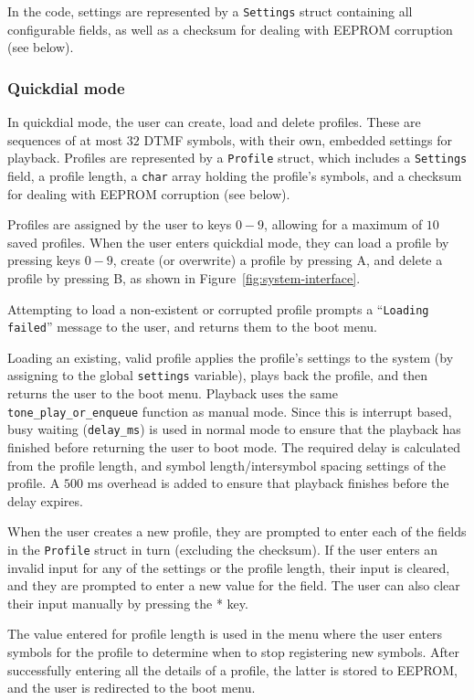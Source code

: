 \documentclass[11pt,a4paper,twocolumn]{scrartcl}
\begin{document}
In the code, settings are represented by a \verb!Settings! struct containing all configurable fields, as well as a checksum for dealing with EEPROM corruption (see below).

\subsubsection{Quickdial mode}

In quickdial mode, the user can create, load and delete profiles. These are sequences of at most $32$ DTMF symbols, with their own, embedded settings for playback. Profiles are represented by a \verb!Profile! struct, which includes a \verb!Settings! field, a profile length, a \verb!char! array holding the profile's symbols, and a checksum for dealing with EEPROM corruption (see below).

Profiles are assigned by the user to keys $0-9$, allowing for a maximum of $10$ saved profiles. When the user enters quickdial mode, they can load a profile by pressing keys $0-9$, create (or overwrite) a profile by pressing A, and delete a profile by pressing B, as shown in Figure~\ref{fig:system-interface}.

Attempting to load a non-existent or corrupted profile prompts a ``\verb!Loading failed!'' message to the user, and returns them to the boot menu. 

Loading an existing, valid profile applies the profile's settings to the system (by assigning to the global \verb!settings! variable), plays back the profile, and then returns the user to the boot menu. Playback uses the same \verb!tone_play_or_enqueue! function as manual mode. Since this is interrupt based, busy waiting (\verb!delay_ms!) is used in normal mode to ensure that the playback has finished before returning the user to boot mode. The required delay is calculated from the profile length, and symbol length/intersymbol spacing settings of the profile. A $500$ ms overhead is added to ensure that playback finishes before the delay expires.

When the user creates a new profile, they are prompted to enter each of the fields in the \verb!Profile! struct in turn (excluding the checksum). If the user enters an invalid input for any of the settings or the profile length, their input is cleared, and they are prompted to enter a new value for the field. The user can also clear their input manually by pressing the * key.

The value entered for profile length is used in the menu where the user enters symbols for the profile to determine when to stop registering new symbols. After successfully entering all the details of a profile, the latter is stored to EEPROM, and the user is redirected to the boot menu.
\end{document}
